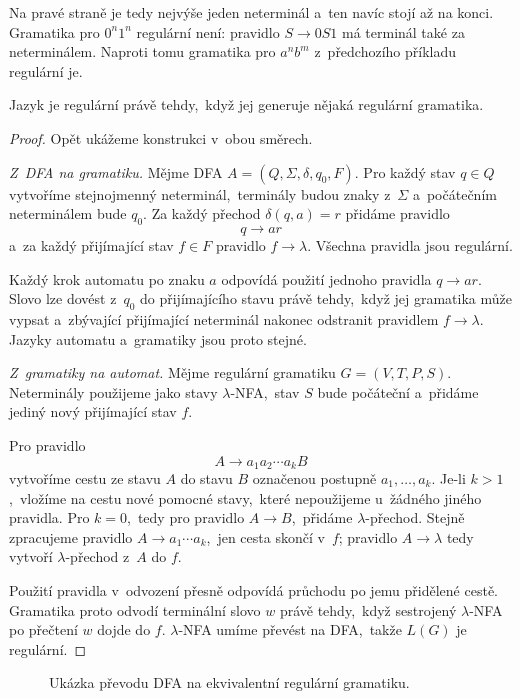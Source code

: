 Na pravé straně je tedy nejvýše jeden neterminál a~ten navíc stojí až na konci. Gramatika pro $0^n1^n$ regulární není: pravidlo $S\to0S1$ má terminál také za neterminálem. Naproti tomu gramatika pro $a^nb^m$ z~předchozího příkladu regulární je.

\begin{theorem}\label{thm:regular-grammar}
    Jazyk je regulární právě tehdy,~když jej generuje nějaká regulární gramatika.
\end{theorem}

\begin{proof}
    Opět ukážeme konstrukci v~obou směrech.

    \emph{Z~DFA na gramatiku.}
    Mějme DFA $A=(Q,\Sigma,\delta,q_0,F)$. Pro každý stav $q\in Q$ vytvoříme stejnojmenný neterminál,~terminály budou znaky z~$\Sigma$ a~počátečním neterminálem bude $q_0$. Za každý přechod $\delta(q,a)=r$ přidáme pravidlo
    \[
        q\to ar
    \]
    a~za každý přijímající stav $f\in F$ pravidlo $f\to\lambda$. Všechna pravidla jsou regulární.

    Každý krok automatu po znaku $a$ odpovídá použití jednoho pravidla $q\to ar$. Slovo lze dovést z~$q_0$ do přijímajícího stavu právě tehdy,~když jej gramatika může vypsat a~zbývající přijímající neterminál nakonec odstranit pravidlem $f\to\lambda$. Jazyky automatu a~gramatiky jsou proto stejné.

    \emph{Z~gramatiky na automat.}
    Mějme regulární gramatiku $G=(V,T,P,S)$. Neterminály použijeme jako stavy $\lambda$-NFA,~stav $S$ bude počáteční a~přidáme jediný nový přijímající stav $f$.

    Pro pravidlo
    \[
        A\to a_1a_2\cdots a_kB
    \]
    vytvoříme cestu ze stavu $A$ do stavu $B$ označenou postupně $a_1,\dots,a_k$. Je-li $k>1$,~vložíme na cestu nové pomocné stavy,~které nepoužijeme u~žádného jiného pravidla. Pro $k=0$,~tedy pro pravidlo $A\to B$,~přidáme $\lambda$-přechod. Stejně zpracujeme pravidlo $A\to a_1\cdots a_k$,~jen cesta skončí v~$f$; pravidlo $A\to\lambda$ tedy vytvoří $\lambda$-přechod z~$A$ do $f$.

    Použití pravidla v~odvození přesně odpovídá průchodu po jemu přidělené cestě. Gramatika proto odvodí terminální slovo $w$ právě tehdy,~když sestrojený $\lambda$-NFA po přečtení $w$ dojde do $f$. $\lambda$-NFA umíme převést na DFA,~takže $L(G)$ je regulární.
\end{proof}

\begin{figure}[h]
    \centering
    
    \caption{Ukázka převodu DFA na ekvivalentní regulární gramatiku.}
    \label{fig:automat-gramatika}
\end{figure}


